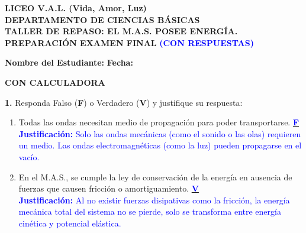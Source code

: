 \documentclass[11pt, letterpaper]{article}
\begin{document}
	
	\begin{center}
		{\Large \textbf{LICEO V.A.L. (Vida, Amor, Luz)}}\\[0.1cm]
		{\large \textbf{DEPARTAMENTO DE CIENCIAS BÁSICAS}}\\[0.1cm]
		{\large \textbf{TALLER DE REPASO: EL M.A.S. POSEE ENERGÍA.}}\\[0.1cm]
		\hfill \textbf{PREPARACIÓN EXAMEN FINAL} \textcolor{blue}{\textbf{(CON RESPUESTAS)}}
	\end{center}
	
	\vspace{0.3cm}
	\noindent \textbf{Nombre del Estudiante:} \underline{\hspace{8.5cm}} \textbf{Fecha:} \underline{\hspace{3cm}}
	
	\vspace{0.2cm}
	\hfill \textbf{CON CALCULADORA}
	\vspace{0.6cm}
	
	\noindent \textbf{1.} Responda Falso (\textbf{F}) o Verdadero (\textbf{V}) y justifique su respuesta:
	\begin{enumerate}[label=\alph*), itemsep=0.4cm, leftmargin=0.8cm]
		\item Todas las ondas necesitan medio de propagación para poder transportarse. \underline{\hspace{0.5cm}\textcolor{blue}{\textbf{ F }}\hspace{0.5cm}} \\
		\textcolor{blue}{\textbf{Justificación:} Solo las ondas mecánicas (como el sonido o las olas) requieren un medio. Las ondas electromagnéticas (como la luz) pueden propagarse en el vacío.}
		
		\item En el M.A.S., se cumple la ley de conservación de la energía en ausencia de fuerzas que causen fricción o amortiguamiento. \underline{\hspace{0.5cm}\textcolor{blue}{\textbf{ V }}\hspace{0.5cm}} \\
		\textcolor{blue}{\textbf{Justificación:} Al no existir fuerzas disipativas como la fricción, la energía mecánica total del sistema no se pierde, solo se transforma entre energía cinética y potencial elástica.}
	\end{enumerate}
	
	\vspace{0.6cm}
	
\end{document}
